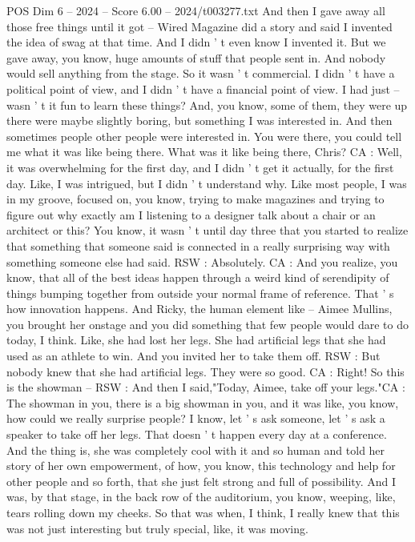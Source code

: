 \begin{textsample}{POS Dim 6 – 2024 – Score 6.00 – 2024/t003277.txt}
And then I gave away all those free things until it got -- Wired Magazine did a story and said I invented the idea of swag at that time.
And I didn ' t even know I invented it.
But we gave away, you know, huge amounts of stuff that people sent in.
And nobody would sell anything from the stage.
So it wasn ' t commercial.
I didn ' t have a political point of view, and I didn ' t have a financial point of view.
I had just -- wasn ' t it fun to learn these things?
And, you know, some of them, they were up there were maybe slightly boring, but something I was interested in.
And then sometimes people other people were interested in.
You were there, you could tell me what it was like being there.
What was it like being there, Chris?
CA : Well, it was overwhelming for the first day, and I didn ' t get it actually, for the first day.
Like, I was intrigued, but I didn ' t understand why.
Like most people, I was in my groove, focused on, you know, trying to make magazines and trying to figure out why exactly am I listening to a designer talk about a chair or an architect or this?
You know, it wasn ' t until day three that you started to realize that something that someone said is connected in a really surprising way with something someone else had said.
RSW : Absolutely.
CA : And you realize, you know, that all of the best ideas happen through a weird kind of serendipity of things bumping together from outside your normal frame of reference.
That ' s how innovation happens.
And Ricky, the human element like -- Aimee Mullins, you brought her onstage and you did something that few people would dare to do today, I think.
Like, she had lost her legs.
She had artificial legs that she had used as an athlete to win.
And you invited her to take them off.
RSW : But nobody knew that she had artificial legs.
They were so good.
CA : Right!
So this is the showman -- RSW : And then I said,"Today, Aimee, take off your legs."CA : The showman in you, there is a big showman in you, and it was like, you know, how could we really surprise people?
I know, let ' s ask someone, let ' s ask a speaker to take off her legs.
That doesn ' t happen every day at a conference.
And the thing is, she was completely cool with it and so human and told her story of her own empowerment, of how, you know, this technology and help for other people and so forth, that she just felt strong and full of possibility.
And I was, by that stage, in the back row of the auditorium, you know, weeping, like, tears rolling down my cheeks.
So that was when, I think, I really knew that this was not just interesting but truly special, like, it was moving.

\end{textsample}
